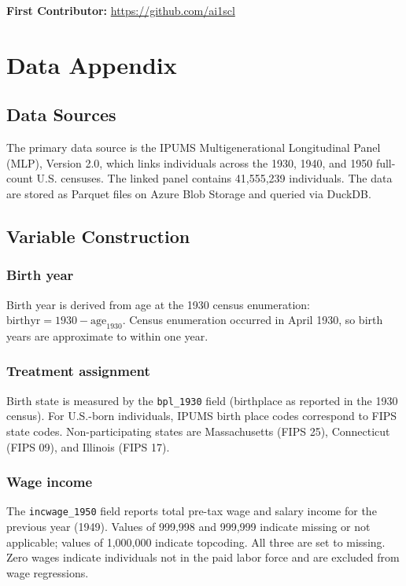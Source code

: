 \documentclass[12pt]{article}
\begin{document}
\noindent\textbf{First Contributor:} \url{https://github.com/ai1scl}

\label{apep_main_text_end}
\newpage


\newpage
\appendix

\section{Data Appendix}
\label{app:data}

\subsection{Data Sources}

The primary data source is the IPUMS Multigenerational Longitudinal Panel (MLP), Version 2.0, which links individuals across the 1930, 1940, and 1950 full-count U.S. censuses. The linked panel contains 41,555,239 individuals. The data are stored as Parquet files on Azure Blob Storage and queried via DuckDB.

\subsection{Variable Construction}

\subsubsection*{Birth year} Birth year is derived from age at the 1930 census enumeration: $\text{birthyr} = 1930 - \text{age}_{1930}$. Census enumeration occurred in April 1930, so birth years are approximate to within one year.

\subsubsection*{Treatment assignment} Birth state is measured by the \texttt{bpl\_1930} field (birthplace as reported in the 1930 census). For U.S.-born individuals, IPUMS birth place codes correspond to FIPS state codes. Non-participating states are Massachusetts (FIPS 25), Connecticut (FIPS 09), and Illinois (FIPS 17).

\subsubsection*{Wage income} The \texttt{incwage\_1950} field reports total pre-tax wage and salary income for the previous year (1949). Values of 999,998 and 999,999 indicate missing or not applicable; values of 1,000,000 indicate topcoding. All three are set to missing. Zero wages indicate individuals not in the paid labor force and are excluded from wage regressions.
\end{document}
